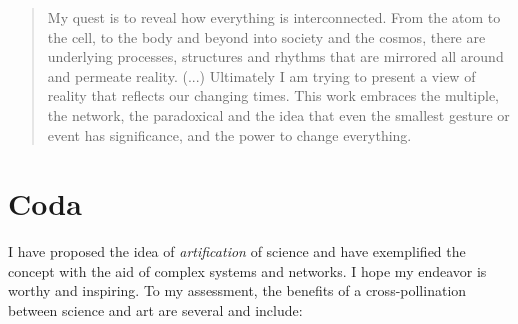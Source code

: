 \documentclass{article}
\begin{document}
\begin{quotation}
My quest is to reveal how everything is interconnected. From the atom to the cell, to the body and beyond into society and the cosmos, there are underlying processes, structures and rhythms that are mirrored all around and permeate reality. (...) Ultimately I am trying to present a view of reality that reflects our changing times. This work embraces the multiple, the network, the paradoxical and the idea that even the smallest gesture or event has significance, and the power to change everything.
\end{quotation}



\section{Coda}
 
I have proposed the idea of \textit{artification} of science \cite{N12} and have exemplified the concept with the aid of complex systems and networks. I hope my endeavor is worthy and inspiring.
To my assessment, the benefits of a cross-pollination between science and art are several and include:
\end{document}
